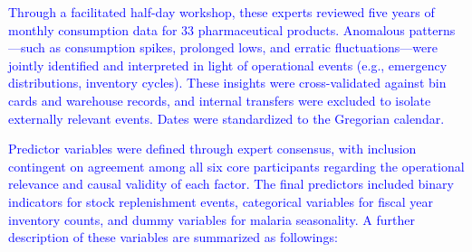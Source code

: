 \documentclass[
  authoryear,
  preprint,
  3p]{elsarticle}
\begin{document}
\textcolor{blue}{Through a facilitated half-day workshop, these experts reviewed five years of monthly consumption data for 33 pharmaceutical products. Anomalous patterns—such as consumption spikes, prolonged lows, and erratic fluctuations—were jointly identified and interpreted in light of operational events (e.g., emergency distributions, inventory cycles). These insights were cross-validated against bin cards and warehouse records, and internal transfers were excluded to isolate externally relevant events. Dates were standardized to the Gregorian calendar.}

\textcolor{blue}{Predictor variables were defined through expert consensus, with inclusion contingent on agreement among all six core participants regarding the operational relevance and causal validity of each factor. The final predictors included binary indicators for stock replenishment events, categorical variables for fiscal year inventory counts, and dummy variables for malaria seasonality. A further description of these variables are summarized as followings:}
\end{document}
